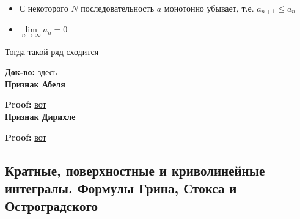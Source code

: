 \documentclass{article}
\begin{document}
\begin{itemize}
	\item С некоторого $N$ последовательность $a$ монотонно убывает, т.е. $a_{n+1} \le a_n$
	\item $\lim\limits_{n \rightarrow \infty}a_n = 0$
\end{itemize}

Тогда такой ряд сходится

{\bf Док-во:} \href{https://ru.wikipedia.org/wiki/%D0%A2%D0%B5%D0%BE%D1%80%D0%B5%D0%BC%D0%B0_%D0%9B%D0%B5%D0%B9%D0%B1%D0%BD%D0%B8%D1%86%D0%B0_%D0%BE_%D1%81%D1%85%D0%BE%D0%B4%D0%B8%D0%BC%D0%BE%D1%81%D1%82%D0%B8_%D0%B7%D0%BD%D0%B0%D0%BA%D0%BE%D1%87%D0%B5%D1%80%D0%B5%D0%B4%D1%83%D1%8E%D1%89%D0%B8%D1%85%D1%81%D1%8F_%D1%80%D1%8F%D0%B4%D0%BE%D0%B2}{здесь}\\

{\bf Признак Абеля}

{\bf Proof:} \href{https://ib.mazurok.com/2015/06/16/%D0%BF%D1%80%D0%B8%D0%B7%D0%BD%D0%B0%D0%BA%D0%B8-%D0%B0%D0%B1%D0%B5%D0%BB%D1%8F-%D0%B8-%D0%B4%D0%B8%D1%80%D0%B8%D1%85%D0%BB%D0%B5/}{вот}\\

{\bf Признак Дирихле}


{\bf Proof:} \href{https://ib.mazurok.com/2015/06/16/%D0%BF%D1%80%D0%B8%D0%B7%D0%BD%D0%B0%D0%BA%D0%B8-%D0%B0%D0%B1%D0%B5%D0%BB%D1%8F-%D0%B8-%D0%B4%D0%B8%D1%80%D0%B8%D1%85%D0%BB%D0%B5/}{вот}\\

\subsection{Кратные, поверхностные и криволинейные интегралы. Формулы Грина, Стокса и Остроградского}
\end{document}
